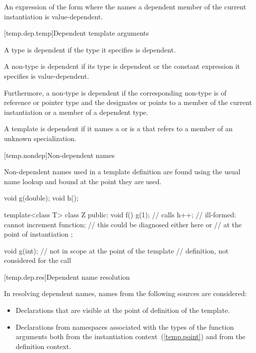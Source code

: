 \pnum
An expression of the form \tcode{\&} where the
 names a dependent member of the current
instantiation is value-dependent.

[temp.dep.temp]{Dependent template arguments}

\pnum
A type
is dependent if the type it specifies is dependent.

\pnum
A non-type
is dependent if its type is dependent or the constant
expression it specifies is value-dependent.

\pnum
Furthermore, a non-type
is dependent if the corresponding non-type 
is of reference or pointer type and the 
designates or points to a member of the current instantiation or a member of
a dependent type.

\pnum
A template
is dependent if it names a
or is a
that refers to a member of an unknown specialization.

[temp.nondep]{Non-dependent names}

\pnum
Non-dependent names used in a template definition are found using the
usual name lookup and bound at the point they are used.
\enterexample

\begin{codeblock}
void g(double);
void h();

template<class T> class Z {
public:
  void f() {
    g(1);           // calls 
    h++;            // ill-formed: cannot increment function;
                    // this could be diagnosed either here or
                    // at the point of instantiation
  }
};

void g(int);        // not in scope at the point of the template
                    // definition, not considered for the call 
\end{codeblock}
\exitexample

[temp.dep.res]{Dependent name resolution}

\pnum
{}%
In resolving dependent names, names from the following sources are considered:

\begin{itemize}
\item
Declarations that are visible at the point of definition of the
template.
\item
Declarations from namespaces associated with the types of the
function arguments both from the instantiation context~(\ref{temp.point})
and from the definition context.
\end{itemize}

